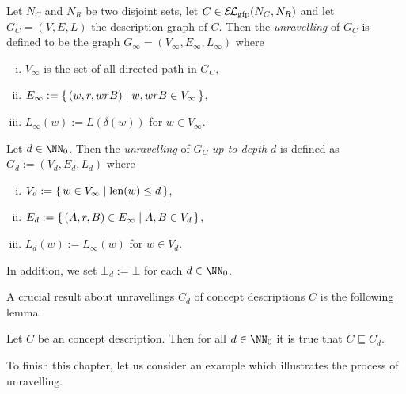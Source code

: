 \begin{Definition}
  \label{def:unravelling-of-EL-description-graphs}
  Let $N_C$ and $N_R$ be two disjoint sets, let $C \in {\ensuremath{{\mathcal{E}\kern-.3ex\mathcal{L}}_\text{gfp}}}(N_C, N_R)$ and let $G_C =
  (V, E, L)$ the \EL description graph of $C$.  Then the \emph{unravelling} of $G_C$ is
  defined to be the graph $G_\infty = (V_\infty, E_\infty, L_\infty)$ where
  \begin{enumerate}[i. ]
  \item $V_\infty$ is the set of all directed path in $G_C$,
  \item $E_\infty := {\{\, (w, r, wrB) \mid w, wrB \in V_\infty \,\}}$,
  \item $L_\infty(w) := L(\delta(w))$ for $w \in V_\infty$.
  \end{enumerate}
  Let $d \in \NN_0$.  Then the \emph{unravelling} of $G_C$ \emph{up to depth $d$} is
  defined as $G_d := (V_d, E_d, L_d)$ where
  \begin{enumerate}[i. ]
  \item $V_d := {\{\, w \in V_\infty \mid \operatorname{len}(w) \le d \,\}}$,
  \item $E_d := {\{\, (A, r, B) \in E_\infty \mid A, B \in V_d \,\}}$,
  \item $L_d(w) := L_\infty(w)$ for $w \in V_d$.
  \end{enumerate}
  In addition, we set $\bot_d := \bot$ for each $d \in \NN_0$.
\end{Definition}

A crucial result about unravellings $C_d$ of concept descriptions $C$ is the following
lemma.

\begin{Lemma}
  \label{lem:unravelling-is-more-general}
  Let $C$ be an \ELgfpbot concept description.  Then for all $d \in \NN_0$ it is true that
  $C \sqsubseteq C_d$.
\end{Lemma}

To finish this chapter, let us consider an example which illustrates the process of
unravelling.

